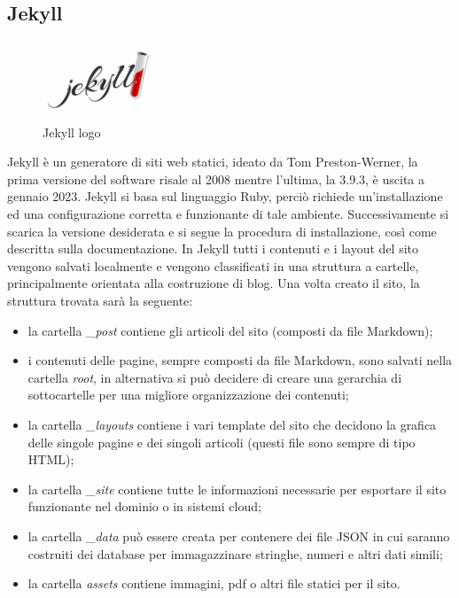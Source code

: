 \documentclass[target=bach,aauheader=]{thud}
\begin{document}
\subsection{Jekyll}
\begin{figure}
    \centering
    \includegraphics[width = 0.3\textwidth]{images/jekyll_teaser.png}
    \caption{Jekyll logo}
\end{figure}

Jekyll è un generatore di siti web statici, ideato da Tom Preston-Werner, la prima versione del software risale al 2008 mentre l'ultima, la 3.9.3, è uscita a gennaio 2023.
Jekyll si basa sul linguaggio Ruby, perciò richiede un'installazione ed una configurazione corretta e funzionante di tale ambiente.
Successivamente si scarica la versione desiderata e si segue la procedura di installazione, così come descritta sulla documentazione.
In Jekyll tutti i contenuti e i layout del sito vengono salvati localmente e vengono classificati in una struttura a cartelle, principalmente orientata alla costruzione di blog. \newline
Una volta creato il sito, la struttura trovata sarà la seguente:
\begin{itemize}
    \item la cartella \textit{\_post} contiene gli articoli del sito (composti da file Markdown);
    \item i contenuti delle pagine, sempre composti da file Markdown, sono salvati nella cartella \textit{root}, in alternativa si può decidere di creare una gerarchia di sottocartelle per una migliore organizzazione dei contenuti;
    \item la cartella \textit{\_layouts} contiene i vari template del sito che decidono la grafica delle singole pagine e dei singoli articoli (questi file sono sempre di tipo HTML);
    \item la cartella \textit{\_site} contiene tutte le informazioni necessarie per esportare il sito funzionante nel dominio o in sistemi cloud;
    \item la cartella \textit{\_data} può essere creata per contenere dei file JSON in cui saranno costruiti dei database per immagazzinare stringhe, numeri e altri dati simili;
    \item la cartella \textit{assets} contiene immagini, pdf o altri file statici per il sito.
\end{itemize}
\end{document}
